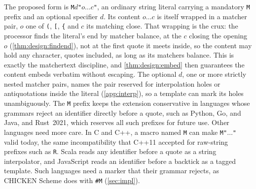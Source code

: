 The proposed form is \verb|M|$d$\verb|"|$o\dots c$\verb|"|,
an ordinary string literal carrying a mandatory \verb|M| prefix
and an optional specifier $d$.
Its content $o\dots c$ is itself wrapped in a matcher pair,
$o$ one of \verb|(|, \verb|[|, \verb|{| and $c$ its matching close.
That wrapping is the crux:
the processor finds the literal's end by matcher balance,
at the $c$ closing the opening $o$ (\cref{thm:design:findend}),
not at the first quote it meets inside,
so the content may hold any character, quotes included,
as long as its matchers balance.
This is exactly the matchertext discipline,
and \cref{thm:design:embed} then guarantees the content embeds verbatim
without escaping.
The optional $d$, one or more strictly nested matcher pairs,
names the pair reserved for interpolation holes or antiquotations
inside the literal (\cref{app:interp}),
so a template can mark its holes unambiguously.
The \verb|M| prefix keeps the extension conservative
in languages whose grammars reject an identifier directly before a quote,
such as Python, Go, and Java,
and Rust~2021, which reserves all such prefixes for future use.
Other languages need more care.
In C and C++, a macro named \verb|M| can make \verb|M"|$\dots$\verb|"| valid today,
the same incompatibility that C++11 accepted for raw-string prefixes such as \verb|R|.
Scala reads any identifier before a quote as a string interpolator,
and JavaScript reads an identifier before a backtick as a tagged template.
Such languages need a marker that their grammar rejects,
as CHICKEN Scheme does with \verb|#M| (\cref{sec:impl}).

